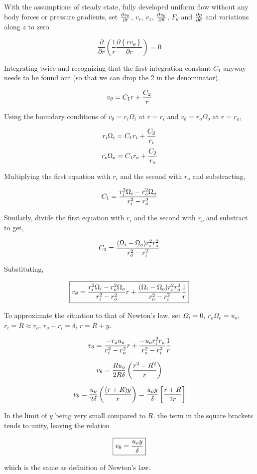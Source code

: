 \begin{solution}[print]

With the assumptions of steady state, fully developed uniform flow without any body forces or pressure gradients, set $\partial v_\theta \over \partial t$, $v_r$, $v_z$, $\partial v_\theta \over \partial \theta$, $F_\theta$ and $\partial p \over \partial \theta$ and variations along $z$ to zero.

$$\frac{\partial}{\partial r}\left(\frac{1}{r} \frac{\partial \left\{rv_\theta\right\}}{\partial r} \right) = 0 $$

Integrating twice and recognizing that the first integration constant $C_1$ anyway needs to be found out (so that we can drop the 2 in the denominator),

$$ v_\theta = C_1 r + {C_2 \over r}$$

Using the boundary conditions of $v_\theta = r_i \Omega_i$ at $r = r_i$ and $v_\theta = r_o \Omega_o$ at $r = r_o$,

$$r_i \Omega_i = C_1 r_i + {C_2 \over r_i}$$
$$r_o \Omega_o = C_1 r_o + {C_2 \over r_o}$$

Multiplying the first equation with $r_i$ and the second with $r_o$ and substracting,

$$C_1 = { r_i^2 \Omega_i - r_o^2\Omega_o \over r_i^2 - r_o^2} $$

Similarly, divide the first equation with $r_i$ and the second with $r_o$ and substract to get,

$$C_2 = {(\Omega_i-\Omega_o) r_i^2 r_o^2 \over r_o^2 - r_i^2}$$

Substituting,

$$\boxed{
v_\theta = { r_i^2 \Omega_i - r_o^2\Omega_o \over r_i^2 - r_o^2} r + {(\Omega_i-\Omega_o) r_i^2 r_o^2 \over r_o^2 - r_i^2} {1 \over r}
} $$

To approximate the situation to that of Newton's law, set $\Omega_i=0$, $r_o\Omega_o = u_o$, $r_i = R \approx r_o$, $r_o - r_i = \delta$, $r = R + y$.

$$ v_\theta = { - r_o u_o \over r_i^2 - r_o^2} r + {-u_o r_i^2 r_o \over r_o^2 - r_i^2} {1 \over r} $$

$$ v_\theta = { R u_o \over 2R\delta} \left({ r^2 - R^2 \over r}\right) $$

$$ v_\theta 
= { u_o \over 2\delta} \left({ (r +  R) y \over r}\right) 
= { u_o y \over \delta} \left[{ r +  R \over 2 r}\right] 
$$

In the limit of $y$ being very small compared to $R$, the term in the square brackets tends to unity, leaving the relation

$$ \boxed{ v_\theta = { u_o y \over \delta} }$$

which is the same as definition of Newton's law.
\end{solution}

